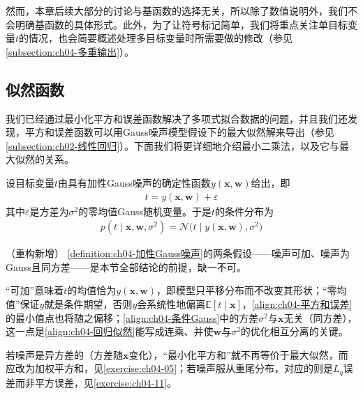 \documentclass[../../main.tex]{subfiles}
\begin{document}
然而，本章后续大部分的讨论与基函数的选择无关，所以除了数值说明外，我们不会明确基函数的具体形式。此外，为了让符号标记简单，我们将重点关注单目标变量$t$的情况，也会简要概述处理多目标变量时所需要做的修改（参见\cref{subsection:ch04-多重输出}）。

\subsection{似然函数}\label{subsection:ch04-似然函数}

我们已经通过最小化平方和误差函数解决了多项式拟合数据的问题，并且我们还发现，平方和误差函数可以用Gauss噪声模型假设下的最大似然解来导出（参见\cref{subsection:ch02-线性回归}）。下面我们将更详细地介绍最小二乘法，以及它与最大似然的关系。

\begin{definition}[加性Gauss噪声模型]\label{definition:ch04-加性Gauss噪声}
设目标变量$t$由具有加性Gauss噪声的确定性函数$y(\boldsymbol{x},\boldsymbol{w})$给出，即
\begin{align}
  t=y(\boldsymbol{x},\boldsymbol{w})+\varepsilon
  \label{align:ch04-加性噪声}
\end{align}
其中$\varepsilon$是方差为$\sigma^2$的零均值Gauss随机变量。于是$t$的条件分布为
\begin{align}
  p(t\mid\boldsymbol{x},\boldsymbol{w},\sigma^2)=\mathcal{N}\bigl(t\mid y(\boldsymbol{x},\boldsymbol{w}),\sigma^2\bigr)
  \label{align:ch04-条件Gauss}
\end{align}
\end{definition}

\begin{remark}（重构新增）
\cref{definition:ch04-加性Gauss噪声}的两条假设——噪声可加、噪声为Gauss且同方差——是本节全部结论的前提，缺一不可。

“可加”意味着$t$的均值恰为$y(\boldsymbol{x},\boldsymbol{w})$，即模型只平移分布而不改变其形状；“零均值”保证$y$就是条件期望，否则$y$会系统性地偏离$\mathbb{E}[t\mid\boldsymbol{x}]$，\eqref{align:ch04-平方和误差}的最小值点也将随之偏移；\eqref{align:ch04-条件Gauss}中的方差$\sigma^2$与$\boldsymbol{x}$无关（同方差），这一点是\eqref{align:ch04-回归似然}能写成连乘、并使$\boldsymbol{w}$与$\sigma^2$的优化相互分离的关键。

若噪声是异方差的（方差随$\boldsymbol{x}$变化），“最小化平方和”就不再等价于最大似然，而应改为加权平方和，见\cref{exercise:ch04-05}；若噪声服从重尾分布，对应的则是$L_q$误差而非平方误差，见\cref{exercise:ch04-11}。
\end{remark}
\end{document}
